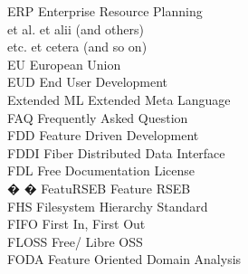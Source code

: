 \begin{tabbing}
    \>ERP \>\>Enterprise Resource Planning\\

    \>et al. \>\>et alii (and others)\\

    \>etc. \>\>et cetera (and so on)\\



    \>EU \>\>European Union\\

    \>EUD \>\>End User Development\\

    \>Extended ML \>\>Extended Meta Language\\

    \>FAQ \>\>Frequently Asked Question\\



    \>FDD \>\>Feature Driven Development\\

    \>FDDI \>\>Fiber Distributed Data Interface\\

    \>FDL \>\>Free Documentation License\\

� � \>FeatuRSEB \>\>Feature RSEB\\


    \>FHS \>\>Filesystem Hierarchy Standard\\


    \>FIFO \>\>First In, First Out\\

    \>FLOSS \>\>Free/ Libre OSS\\

    \>FODA \>\>Feature Oriented Domain Analysis\\


\end{tabbing}
